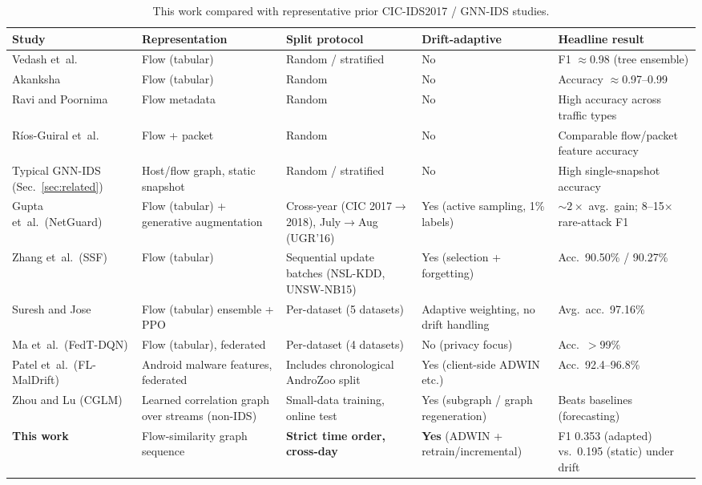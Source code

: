 \documentclass[twocolumn]{llncs}
\begin{document}
\begin{table}[!t]
\centering
\caption{This work compared with representative prior CIC-IDS2017 / GNN-IDS studies.}
\label{tab:comparison}
\footnotesize
\setlength{\tabcolsep}{4pt}
\renewcommand{\arraystretch}{1.25}
\begin{tabularx}{\textwidth}{|>{\raggedright\arraybackslash}p{2.9cm}|Y|Y|Y|Y|}
\hline
\textbf{Study} & \textbf{Representation} & \textbf{Split protocol} & \textbf{Drift-adaptive} & \textbf{Headline result} \\
\hline\hline
Vedash et~al.\ \cite{vedash2026xai} & Flow (tabular) & Random / stratified & No & F1 $\approx$0.98 (tree ensemble) \\
\hline
Akanksha \cite{akanksha2025malware} & Flow (tabular) & Random & No & Accuracy $\approx$0.97--0.99 \\
\hline
Ravi and Poornima \cite{ravi2025flowmetadata} & Flow metadata & Random & No & High accuracy across traffic types \\
\hline
R{\'i}os-Guiral et~al.\ \cite{riosguiral2024flowspackets} & Flow + packet & Random & No & Comparable flow/packet feature accuracy \\
\hline
Typical GNN-IDS (Sec.~\ref{sec:related}) & Host/flow graph, static snapshot & Random / stratified & No & High single-snapshot accuracy \\
\hline
Gupta et~al.\ (NetGuard) \cite{gupta2026netguard} & Flow (tabular) + generative augmentation & Cross-year (CIC 2017$\rightarrow$2018), July$\rightarrow$Aug (UGR'16) & Yes (active sampling, 1\% labels) & $\sim2\times$ avg.\ gain; 8--15$\times$ rare-attack F1 \\
\hline
Zhang et~al.\ (SSF) \cite{zhang2025ssf} & Flow (tabular) & Sequential update batches (NSL-KDD, UNSW-NB15) & Yes (selection + forgetting) & Acc.\ 90.50\% / 90.27\% \\
\hline
Suresh and Jose \cite{suresh2025ppo} & Flow (tabular) ensemble + PPO & Per-dataset (5 datasets) & Adaptive weighting, no drift handling & Avg.\ acc.\ 97.16\% \\
\hline
Ma et~al.\ (FedT-DQN) \cite{ma2025fedtdqn} & Flow (tabular), federated & Per-dataset (4 datasets) & No (privacy focus) & Acc.\ $>$99\% \\
\hline
Patel et~al.\ (FL-MalDrift) \cite{patel2026fmaldrift} & Android malware features, federated & Includes chronological AndroZoo split & Yes (client-side ADWIN etc.) & Acc.\ 92.4--96.8\% \\
\hline
Zhou and Lu (CGLM) \cite{zhou2025cglm} & Learned correlation graph over streams (non-IDS) & Small-data training, online test & Yes (subgraph / graph regeneration) & Beats baselines (forecasting) \\
\hline
\textbf{This work} & Flow-similarity graph sequence & \textbf{Strict time order, cross-day} & \textbf{Yes} (ADWIN + retrain/incremental) & F1 0.353 (adapted) vs.\ 0.195 (static) under drift \\
\hline
\end{tabularx}
\end{table}
\end{document}
